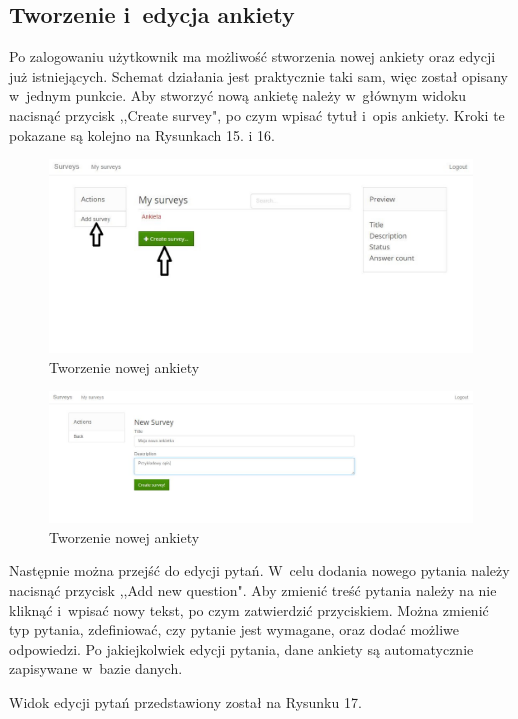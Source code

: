 \documentclass[8pt,a4paper,notitlepage]{article}
\begin{document}
\subsection{Tworzenie i~edycja ankiety}
Po zalogowaniu użytkownik ma możliwość stworzenia nowej ankiety oraz edycji już istniejących. Schemat działania jest praktycznie taki sam, więc został opisany w~jednym punkcie. Aby stworzyć nową ankietę należy w~głównym widoku nacisnąć przycisk ,,Create survey", po czym wpisać tytuł i~opis ankiety. Kroki te pokazane są kolejno na Rysunkach 15. i 16.

\begin{figure}[H]
    \centering
    \includegraphics[width=\linewidth]{obrazy/newSurvey}
    \caption{Tworzenie nowej ankiety}
\end{figure} 

\begin{figure}[H]
    \centering
    \includegraphics[width=\linewidth]{obrazy/edycjaBasic}
    \caption{Tworzenie nowej ankiety}
\end{figure} 

Następnie można przejść do edycji pytań. W~celu dodania nowego pytania należy nacisnąć przycisk ,,Add new question". Aby zmienić treść pytania należy na nie kliknąć i~wpisać nowy tekst, po czym zatwierdzić przyciskiem. Można zmienić typ pytania, zdefiniować, czy pytanie jest wymagane, oraz dodać możliwe odpowiedzi. Po jakiejkolwiek edycji pytania, dane ankiety są automatycznie zapisywane w~bazie danych.
\par Widok edycji pytań przedstawiony został na Rysunku 17.
\end{document}
